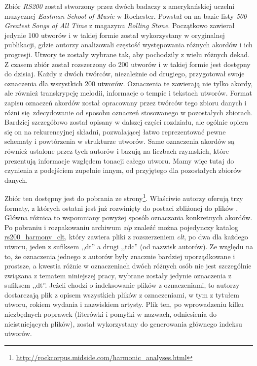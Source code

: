 Zbiór \emph{RS200} \cite{de_clercq_corpus_2011} został stworzony przez dwóch badaczy z amerykańskiej uczelni muzycznej \emph{Eastman School of Music} w Rochester. Powstał on na bazie listy \emph{500 Greatest Songs of All Time} z magazynu \emph{Rolling Stone}. Początkowo zawierał jedynie 100 utworów i w takiej formie został wykorzystany w oryginalnej publikacji, gdzie autorzy analizowali częstość występowania różnych akordów i ich progresji. Utwory te zostały wybrane tak, aby pochodziły z wielu różnych dekad. Z czasem zbiór został rozszerzony do 200 utworów i w takiej formie jest dostępny do dzisiaj. Każdy z dwóch twórców, niezależnie od drugiego, przygotował swoje oznaczenia dla wszystkich 200 utworów. Oznaczenia te zawierają nie tylko akordy, ale również transkrypcję melodii, informacje o tempie i tekstach utworów. Format zapisu oznaczeń akordów został opracowany przez twórców tego zbioru danych i różni się zdecydowanie od sposobu oznaczeń stosowanego w pozostałych zbiorach.  Bardziej szczegółowo został opisany w dalszej części rozdziału, ale ogólnie opiera się on na rekurencyjnej składni, pozwalającej łatwo reprezentować pewne schematy i powtórzenia w strukturze utworów. Same oznaczenia akordów są również ustalone przez tych autorów i bazują na liczbach rzymskich, które prezentują informacje względem tonacji całego utworu. Mamy więc tutaj do czynienia z podejściem zupełnie innym, od przyjętego dla pozostałych zbiorów danych.

Zbiór ten dostępny jest do pobrania ze strony\footnote{\url{http://rockcorpus.midside.com/harmonic_analyses.html}}. Właściwie autorzy oferują trzy formaty, z których ostatni jest już rozwinięty do postaci zbliżonej do plików . Główna różnica to wspomniany powyżej sposób oznaczania konkretnych akordów. Po pobraniu i rozpakowaniu archiwum \emph{zip} znaleźć można pojedynczy katalog \url{rs200_harmony_clt}, który zawiera pliki z rozszerzeniem \emph{clt}, po dwa dla każdego utworu, jeden z sufiksem ,,dt'' a drugi ,,tdc'' (od nazwisk autorów). Ze względu na to, że oznaczenia jednego z autorów były znacznie bardziej uporządkowane i prostsze, a kwestia różnic w oznaczeniach dwóch różnych osób nie jest szczególnie związana z tematem niniejszej pracy, wybrane zostały jedynie oznaczenia z sufiksem ,,dt''. Jeżeli chodzi o indeksowanie plików z oznaczeniami, to autorzy dostarczają plik  z opisem wszystkich plików z oznaczeniami, w tym z tytułem utworu, rokiem wydania i nazwiskiem artysty. Plik ten, po wprowadzeniu kilku niezbędnych poprawek (literówki i pomyłki w nazwach, odniesienia do nieistniejących plików), został wykorzystany do generowania głównego indeksu utworów.

